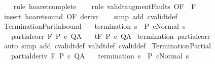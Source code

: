 \begin{isabellebody}
%
\isadelimproof
\ \ %
\endisadelimproof
%
\isatagproof
{}\isamarkupfalse%
\ {\isacharparenleft}rule\ hoaret{\isacharunderscore}complete{\isacharparenright}\isanewline
\ \ \isamarkupfalse%
\ {\isacharparenleft}rule\ validt{\isacharunderscore}augment{\isacharunderscore}Faults\ {\isacharbrackleft}OF\ {\isacharunderscore}\ F{\isacharbrackright}{\isacharparenright}\isanewline
\ \ \isamarkupfalse%
\ {\isacharparenleft}insert\ hoaret{\isacharunderscore}sound\ {\isacharbrackleft}OF\ deriv{\isacharunderscore}c{\isacharbrackright}{\isacharparenright}\isanewline
\ \ \isamarkupfalse%
\ {\isacharparenleft}simp\ add{\isacharcolon}\ cvalidt{\isacharunderscore}def{\isacharparenright}%
\endisatagproof
{\isafoldproof}%
%
\isadelimproof
\isanewline
%
\endisadelimproof
\isanewline
{}\isamarkupfalse%
\ TerminationPartial{\isacharunderscore}sound{\isacharcolon}\isanewline
\ \ \ {\isachardoublequoteopen}termination{\isachardoublequoteclose}{\isacharcolon}\ {\isachardoublequoteopen}{\isasymforall}s\ {\isasymin}\ P{\isachardot}\ {\isasymGamma}{\isasymturnstile}c{\isasymdown}Normal\ s{\isachardoublequoteclose}\isanewline
\ \ \ partial{\isacharunderscore}corr{\isacharcolon}\ {\isachardoublequoteopen}{\isasymGamma}{\isacharcomma}{\isasymTheta}{\isasymTurnstile}\isactrlbsub {\isacharslash}F\isactrlesub \ P\ c\ Q{\isacharcomma}A{\isachardoublequoteclose}\isanewline
\ \ \ {\isachardoublequoteopen}{\isasymGamma}{\isacharcomma}{\isasymTheta}{\isasymTurnstile}\isactrlsub t\isactrlbsub {\isacharslash}F\isactrlesub \ P\ c\ Q{\isacharcomma}A{\isachardoublequoteclose}\isanewline
%
\isadelimproof
%
\endisadelimproof
%
\isatagproof
{}\isamarkupfalse%
\ {\isachardoublequoteopen}termination{\isachardoublequoteclose}\ partial{\isacharunderscore}corr\ \isanewline
{}\isamarkupfalse%
\ {\isacharparenleft}auto\ simp\ add{\isacharcolon}\ cvalidt{\isacharunderscore}def\ validt{\isacharunderscore}def\ cvalid{\isacharunderscore}def{\isacharparenright}%
\endisatagproof
{\isafoldproof}%
%
\isadelimproof
\isanewline
%
\endisadelimproof
\isanewline
{}\isamarkupfalse%
\ TerminationPartial{\isacharcolon}\isanewline
\ \ \ partial{\isacharunderscore}deriv{\isacharcolon}\ {\isachardoublequoteopen}{\isasymGamma}{\isacharcomma}{\isasymTheta}{\isasymturnstile}\isactrlbsub {\isacharslash}F\isactrlesub \ P\ c\ Q{\isacharcomma}A{\isachardoublequoteclose}\isanewline
\ \ \ {\isachardoublequoteopen}termination{\isachardoublequoteclose}{\isacharcolon}\ {\isachardoublequoteopen}{\isasymforall}s\ {\isasymin}\ P{\isachardot}\ {\isasymGamma}{\isasymturnstile}c{\isasymdown}Normal\ s{\isachardoublequoteclose}\isanewline

\end{isabellebody}

